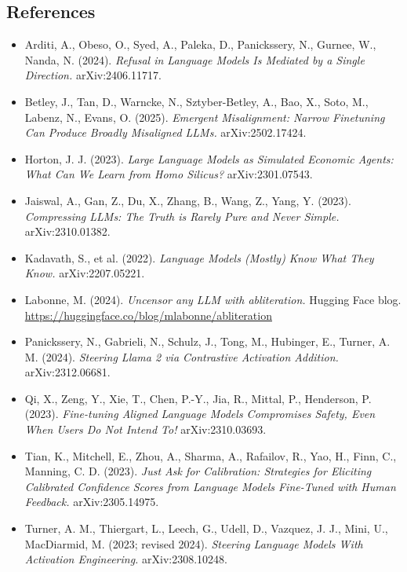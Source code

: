 \documentclass[
  10pt,
]{article}
\providecommand{\tightlist}{%
  \setlength{\itemsep}{0pt}\setlength{\parskip}{0pt}}
\begin{document}
\subsection{References}\label{references}

\begin{itemize}
\tightlist
\item
  Arditi, A., Obeso, O., Syed, A., Paleka, D., Panickssery, N., Gurnee,
  W., Nanda, N. (2024). \emph{Refusal in Language Models Is Mediated by
  a Single Direction.} arXiv:2406.11717.
\item
  Betley, J., Tan, D., Warncke, N., Sztyber-Betley, A., Bao, X., Soto,
  M., Labenz, N., Evans, O. (2025). \emph{Emergent Misalignment: Narrow
  Finetuning Can Produce Broadly Misaligned LLMs.} arXiv:2502.17424.
\item
  Horton, J. J. (2023). \emph{Large Language Models as Simulated
  Economic Agents: What Can We Learn from Homo Silicus?}
  arXiv:2301.07543.
\item
  Jaiswal, A., Gan, Z., Du, X., Zhang, B., Wang, Z., Yang, Y. (2023).
  \emph{Compressing LLMs: The Truth is Rarely Pure and Never Simple.}
  arXiv:2310.01382.
\item
  Kadavath, S., et al. (2022). \emph{Language Models (Mostly) Know What
  They Know.} arXiv:2207.05221.
\item
  Labonne, M. (2024). \emph{Uncensor any LLM with abliteration.} Hugging
  Face blog. \url{https://huggingface.co/blog/mlabonne/abliteration}
\item
  Panickssery, N., Gabrieli, N., Schulz, J., Tong, M., Hubinger, E.,
  Turner, A. M. (2024). \emph{Steering Llama 2 via Contrastive
  Activation Addition.} arXiv:2312.06681.
\item
  Qi, X., Zeng, Y., Xie, T., Chen, P.-Y., Jia, R., Mittal, P.,
  Henderson, P. (2023). \emph{Fine-tuning Aligned Language Models
  Compromises Safety, Even When Users Do Not Intend To!}
  arXiv:2310.03693.
\item
  Tian, K., Mitchell, E., Zhou, A., Sharma, A., Rafailov, R., Yao, H.,
  Finn, C., Manning, C. D. (2023). \emph{Just Ask for Calibration:
  Strategies for Eliciting Calibrated Confidence Scores from Language
  Models Fine-Tuned with Human Feedback.} arXiv:2305.14975.
\item
  Turner, A. M., Thiergart, L., Leech, G., Udell, D., Vazquez, J. J.,
  Mini, U., MacDiarmid, M. (2023; revised 2024). \emph{Steering Language
  Models With Activation Engineering.} arXiv:2308.10248.
\end{itemize}
\end{document}
